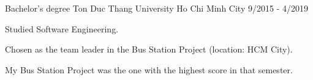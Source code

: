 
\begin{cventries}

  \cventry
    {Bachelor's degree} %
    {Ton Duc Thang University} %
    {Ho Chi Minh City} %
    {9/2015 - 4/2019} %
    {
      \begin{cvitems} %
        \item {Studied Software Engineering.}
        \item {Chosen as the team leader in the Bus Station Project (location: HCM City).}
        \item {My Bus Station Project was the one with the highest score in that semester.}
      \end{cvitems}
    }

\end{cventries}
